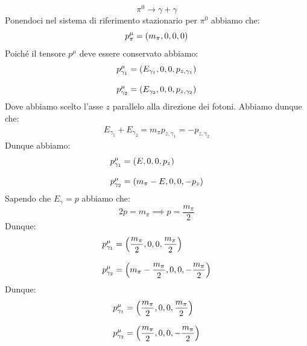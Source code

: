 \begin{equation}
  \pi^0 \rightarrow \gamma + \gamma
\end{equation}
Ponendoci nel sistema di riferimento stazionario per $\pi^0$ abbiamo che:
\begin{equation}
  p_{\pi}^\mu = \left(m_\pi, 0, 0, 0\right)
\end{equation}
Poiché il tensore $p^\mu$ deve essere conservato abbiamo:
\begin{equation}
  \begin{split}
    &p_{\gamma_1}^\mu = \left(E_{\gamma_1}, 0, 0, p_{z,\gamma_1}\right) \\[8pt]
    &p_{\gamma_2}^\mu = \left(E_{\gamma_2}, 0, 0, p_{z,\gamma_2}\right)
  \end{split}
\end{equation}
Dove abbiamo scelto l'asse $z$ parallelo alla direzione dei fotoni. Abbiamo dunque che:
\begin{equation}
  \begin{split}
    E_{\gamma_1} + E_{\gamma_2} = m_\pi
    p_{z,\gamma_1} = - p_{z,\gamma_2}
  \end{split}
\end{equation}
Dunque abbiamo:
\begin{equation}
  \begin{split}
    &p_{\gamma_1}^\mu = \left(E, 0, 0, p_z\right) \\[8pt]
    &p_{\gamma_2}^\mu = \left(m_\pi - E, 0, 0, -p_z\right)
  \end{split}
\end{equation}
Sapendo che $E_\gamma = p$ abbiamo che:
\begin{equation}
  2p = m_\pi \implies p = \dfrac{m_\pi}{2}
\end{equation}
Dunque:
\begin{equation}
  \begin{split}
    &p_{\gamma_1}^\mu = \left(\dfrac{m_\pi}{2}, 0, 0, \dfrac{m_\pi}{2}\right) \\[8pt]
    &p_{\gamma_2}^\mu = \left(m_\pi - \dfrac{m_\pi}{2}, 0, 0, -\dfrac{m_\pi}{2}\right)
  \end{split}
\end{equation}
Dunque:
\begin{equation}
  \begin{split}
    &p_{\gamma_1}^\mu = \left(\dfrac{m_\pi}{2}, 0, 0, \dfrac{m_\pi}{2}\right) \\[8pt]
    &p_{\gamma_2}^\mu = \left(\dfrac{m_\pi}{2}, 0, 0, -\dfrac{m_\pi}{2}\right)
  \end{split}
\end{equation}
